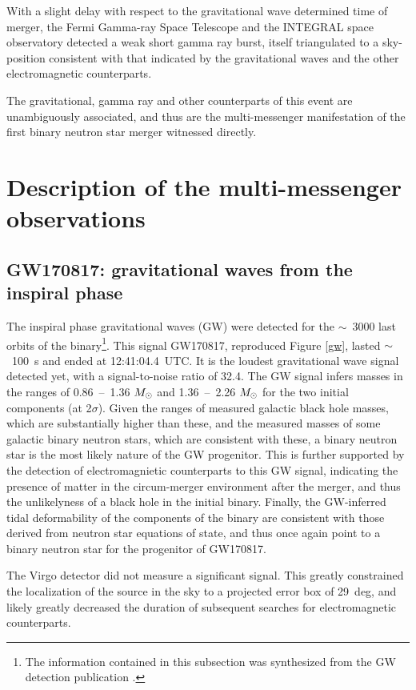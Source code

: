 With a slight delay with respect to the gravitational wave determined time of merger, the Fermi Gamma-ray Space Telescope and the INTEGRAL space observatory detected a weak short gamma ray burst, itself triangulated to a sky-position consistent with that indicated by the gravitational waves and the other electromagnetic counterparts.

The gravitational, gamma ray and other counterparts of this event are unambiguously associated, and thus are the multi-messenger manifestation of the first binary neutron star merger witnessed directly.

\section{Description of the multi-messenger observations}

\subsection{GW170817: gravitational waves from the inspiral phase}

The inspiral phase gravitational waves (GW) were detected for the $\sim$~3000 last orbits of the binary\footnote{The information contained in this subsection was synthesized from the GW detection publication \cite{23}.}. This signal GW170817, reproduced Figure \ref{gw}, lasted $\sim$~100~s and ended at 12:41:04.4~UTC. It is the loudest gravitational wave signal detected yet, with a signal-to-noise ratio of 32.4. The GW signal infers masses in the ranges of 0.86~--~1.36 $M_{\odot}$ and 1.36~--~2.26 $M_{\odot}$ for the two initial components (at 2$\sigma$). Given the ranges of measured galactic black hole masses, which are substantially higher than these, and the measured masses of some galactic binary neutron stars, which are consistent with these, a binary neutron star is the most likely nature of the GW progenitor. This is further supported by the detection of electromagnietic counterparts to this GW signal, indicating the presence of matter in the circum-merger environment after the merger, and thus the unlikelyness of a black hole in the initial binary. Finally, the GW-inferred tidal deformability of the components of the binary are consistent with those derived from neutron star equations of state, and thus once again point to a binary neutron star for the progenitor of GW170817.

The Virgo detector did not measure a significant signal. This greatly constrained the localization of the source in the sky to a projected error box of 29~deg, and likely greatly decreased the duration of subsequent searches for electromagnetic counterparts.

